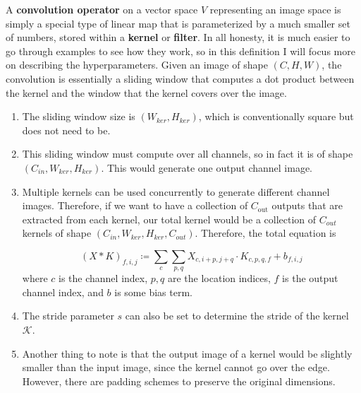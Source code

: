 \documentclass{article}
\begin{document}
    \begin{definition}
      A \textbf{convolution operator} on a vector space $V$ representing an image space is simply a special type of linear map that is parameterized by a much smaller set of numbers, stored within a \textbf{kernel} or \textbf{filter}. In all honesty, it is much easier to go through examples to see how they work, so in this definition I will focus more on describing the hyperparameters. Given an image of shape $(C, H, W)$, the convolution is essentially a sliding window that computes a dot product between the kernel and the window that the kernel covers over the image. 
    \begin{enumerate}
      \item The sliding window size is $(W_{ker}, H_{ker})$, which is conventionally square but does not need to be. 

      \item This sliding window must compute over all channels, so in fact it is of shape $(C_{in}, W_{ker}, H_{ker})$. This would generate one output channel image. 

      \item Multiple kernels can be used concurrently to generate different channel images. Therefore, if we want to have a collection of $C_{\text{out}}$ outputs that are extracted from each kernel, our total kernel would be a collection of $C_{out}$ kernels of shape $(C_{in}, W_{ker}, H_{ker}, C_{out})$. Therefore, the total equation is 

        \[(X \ast K)_{f, i, j} \coloneqq \sum_c \sum_{p, q} X_{c, i + p, j + q} \cdot K_{c, p, q, f} + b_{f, i, j} \]
      where $c$ is the channel index, $p, q$ are the location indices, $f$ is the output channel index, and $b$ is some bias term. 

      \item The stride parameter $s$ can also be set to determine the stride of the kernel $\mathcal{K}$. 

      \item Another thing to note is that the output image of a kernel would be slightly smaller than the input image, since the kernel cannot go over the edge. However, there are padding schemes to preserve the original dimensions. 


\end{enumerate}
\end{definition}
\end{document}
